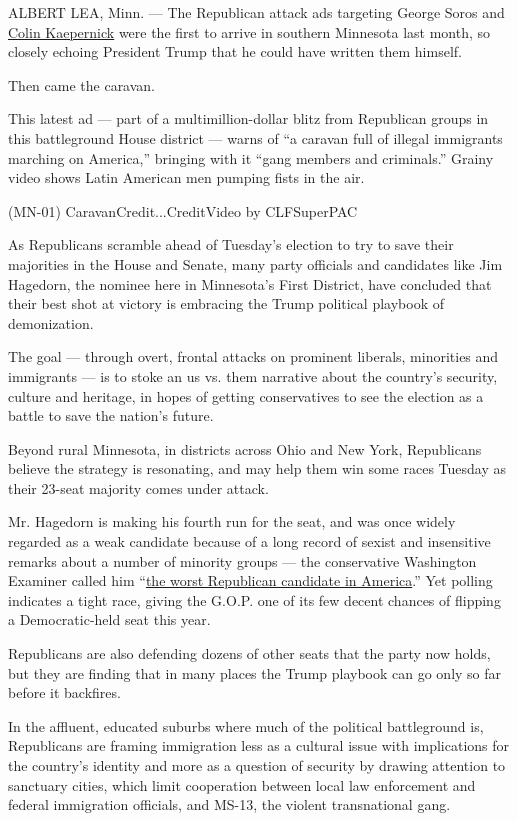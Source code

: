 ALBERT LEA, Minn. --- The Republican attack ads targeting George Soros
and \href{https://youtu.be/9-22S-kFong}{Colin Kaepernick} were the first
to arrive in southern Minnesota last month, so closely echoing President
Trump that he could have written them himself.

Then came the caravan.

This latest ad --- part of a multimillion-dollar blitz from Republican
groups in this battleground House district --- warns of ``a caravan full
of illegal immigrants marching on America,'' bringing with it ``gang
members and criminals.'' Grainy video shows Latin American men pumping
fists in the air.

(MN-01) CaravanCredit...CreditVideo by CLFSuperPAC

As Republicans scramble ahead of Tuesday's election to try to save their
majorities in the House and Senate, many party officials and candidates
like Jim Hagedorn, the nominee here in Minnesota's First District, have
concluded that their best shot at victory is embracing the Trump
political playbook of demonization.

The goal --- through overt, frontal attacks on prominent liberals,
minorities and immigrants --- is to stoke an us vs. them narrative about
the country's security, culture and heritage, in hopes of getting
conservatives to see the election as a battle to save the nation's
future.

Beyond rural Minnesota, in districts across Ohio and New York,
Republicans believe the strategy is resonating, and may help them win
some races Tuesday as their 23-seat majority comes under attack.

Mr. Hagedorn is making his fourth run for the seat, and was once widely
regarded as a weak candidate because of a long record of sexist and
insensitive remarks about a number of minority groups --- the
conservative Washington Examiner called him
``\href{https://www.washingtonexaminer.com/opinion/jim-hagedorn-the-worst-republican-candidate-in-america}{the
worst Republican candidate in America}.'' Yet polling indicates a tight
race, giving the G.O.P. one of its few decent chances of flipping a
Democratic-held seat this year.

Republicans are also defending dozens of other seats that the party now
holds, but they are finding that in many places the Trump playbook can
go only so far before it backfires.

In the affluent, educated suburbs where much of the political
battleground is, Republicans are framing immigration less as a cultural
issue with implications for the country's identity and more as a
question of security by drawing attention to sanctuary cities, which
limit cooperation between local law enforcement and federal immigration
officials, and MS-13, the violent transnational gang.

